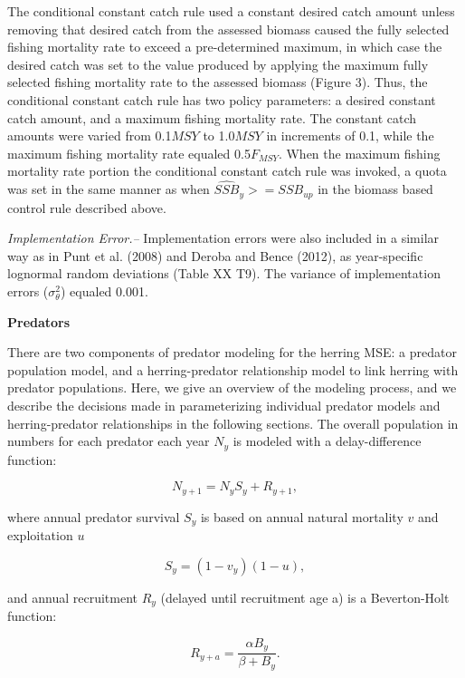 \documentclass[]{article}
\begin{document}
The conditional constant catch rule used a constant desired catch amount
unless removing that desired catch from the assessed biomass caused the
fully selected fishing mortality rate to exceed a pre-determined
maximum, in which case the desired catch was set to the value produced
by applying the maximum fully selected fishing mortality rate to the
assessed biomass (Figure 3). Thus, the conditional constant catch rule
has two policy parameters: a desired constant catch amount, and a
maximum fishing mortality rate. The constant catch amounts were varied
from 0.1\(MSY\) to 1.0\(MSY\) in increments of 0.1, while the maximum
fishing mortality rate equaled 0.5\(F_{MSY}\). When the maximum fishing
mortality rate portion the conditional constant catch rule was invoked,
a quota was set in the same manner as when
\(\widehat{SSB}_y >= SSB_{up}\) in the biomass based control rule
described above.

\emph{Implementation Error.--} Implementation errors were also included
in a similar way as in Punt et al. (2008) and Deroba and Bence (2012),
as year-specific lognormal random deviations (Table XX T9). The variance
of implementation errors (\(\sigma_\theta^2\)) equaled 0.001.

\textbf{Predators}

There are two components of predator modeling for the herring MSE: a
predator population model, and a herring-predator relationship model to
link herring with predator populations. Here, we give an overview of the
modeling process, and we describe the decisions made in parameterizing
individual predator models and herring-predator relationships in the
following sections. The overall population in numbers for each predator
each year \(N_{y}\) is modeled with a delay-difference function:

\begin{equation}
N_{y+1} = N_{y}S_{y} +  R_{y+1} \label{delaydiffN_equation},
\end{equation}

where annual predator survival \(S_{y}\) is based on annual natural
mortality \(v\) and exploitation \(u\)

\begin{equation}
S_{y} =  (1-v_{y})(1-u) \label{survival_equation},
\end{equation}

and annual recruitment \(R_{y}\) (delayed until recruitment age a) is a
Beverton-Holt function:

\begin{equation}
R_{y+a} = \frac{\alpha B_{y}}{\beta + B_{y}} \label{delaydiffrec_equation}.
\end{equation}
\end{document}
